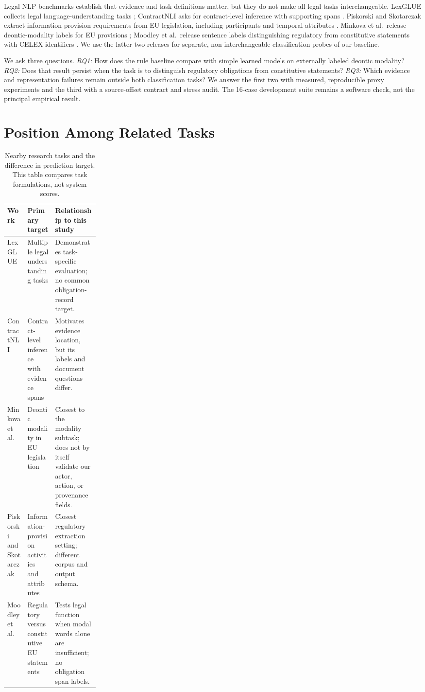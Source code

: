 \documentclass[11pt,a4paper]{article}
\begin{document}
Legal NLP benchmarks establish that evidence and task definitions matter, but they do not make all legal tasks interchangeable. LexGLUE collects legal language-understanding tasks \cite{lexglue}; ContractNLI asks for contract-level inference with supporting spans \cite{contractnli}. Piskorski and Skotarczak extract information-provision requirements from EU legislation, including participants and temporal attributes \cite{piskorski2025}. Minkova et al.\ release deontic-modality labels for EU provisions \cite{minkova2023,minkovadata}; Moodley et al.\ release sentence labels distinguishing regulatory from constitutive statements with CELEX identifiers \cite{moodleydata}. We use the latter two releases for separate, non-interchangeable classification probes of our baseline.

We ask three questions. \emph{RQ1:} How does the rule baseline compare with simple learned models on externally labeled deontic modality? \emph{RQ2:} Does that result persist when the task is to distinguish regulatory obligations from constitutive statements? \emph{RQ3:} Which evidence and representation failures remain outside both classification tasks? We answer the first two with measured, reproducible proxy experiments and the third with a source-offset contract and stress audit. The 16-case development suite remains a software check, not the principal empirical result.

\section{Position Among Related Tasks}
\begin{table}[ht]
\centering\small
\caption{Nearby research tasks and the difference in prediction target. This table compares task formulations, not system scores.}
\label{tab:related}
\begin{tabularx}{\linewidth}{@{}p{0.22\linewidth}Y Y@{}}
\toprule
Work & Primary target & Relationship to this study\\
\midrule
LexGLUE \cite{lexglue} & Multiple legal understanding tasks & Demonstrates task-specific evaluation; no common obligation-record target.\\
ContractNLI \cite{contractnli} & Contract-level inference with evidence spans & Motivates evidence location, but its labels and document questions differ.\\
Minkova et al.\ \cite{minkova2023} & Deontic modality in EU legislation & Closest to the modality subtask; does not by itself validate our actor, action, or provenance fields.\\
Piskorski and Skotarczak \cite{piskorski2025} & Information-provision activities and attributes & Closest regulatory extraction setting; different corpus and output schema.\\
Moodley et al.\ \cite{moodleydata} & Regulatory versus constitutive EU statements & Tests legal function when modal words alone are insufficient; no obligation span labels.\\
\bottomrule
\end{tabularx}
\end{table}
\end{document}
